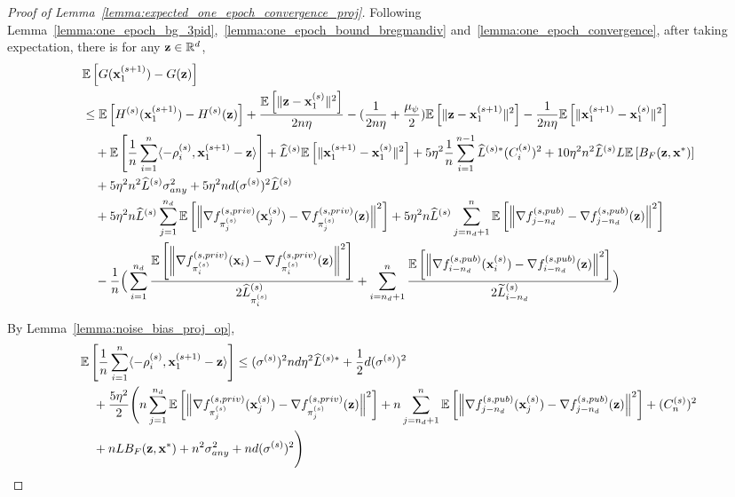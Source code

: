 \begin{proof}[Proof of Lemma~\ref{lemma:expected_one_epoch_convergence_proj}]
Following Lemma~\ref{lemma:one_epoch_bg_3pid},~\ref{lemma:one_epoch_bound_bregmandiv} and~\ref{lemma:one_epoch_convergence}, after taking expectation, there is for any ${\mathbf{z}}\in \mathbb{R}^{d}$,
\begin{align}
\label{eq:proj_interm}
    &\mathbb{E}\left[G({\mathbf{x}}_1^{(s+1)}) - G({\mathbf{z}})\right]\\
    \nonumber
    &\leq \mathbb{E}\left[ H^{(s)}({\mathbf{x}}_1^{(s+1)}) - H^{(s)}({\mathbf{z}})\right]
        + \frac{\mathbb{E}\left[\|{\mathbf{z}} - {\mathbf{x}}_1^{(s)}\|^2 \right]}{2n \eta}
    - (\frac{1}{2n \eta} + \frac{\mu_\psi}{2}) \mathbb{E}\left[\|{\mathbf{z}} - {\mathbf{x}}_1^{(s+1)}\|^2\right]
        - \frac{1}{2n \eta}\mathbb{E}\left[\|{\mathbf{x}}_1^{(s+1)} - {\mathbf{x}}_1^{(s)}\|^2 \right]\\
    \nonumber
    &\quad + \mathbb{E}\left[\frac{1}{n}\sum_{i=1}^{n}\langle -\rho_i^{(s)}, {\mathbf{x}}_1^{(s+1)} - {\mathbf{z}}\rangle\right]
    + \widehat{L}^{(s)}\mathbb{E}\left[\| {\mathbf{x}}_1^{(s+1)} - {\mathbf{x}}_1^{(s)}\|^2\right]
    + 5\eta^2 \frac{1}{n}\sum_{i=1}^{n-1} \widehat{L}^{(s)*} (C_i^{(s)})^2
    + 10 \eta^2 n^2 \widehat{L}^{(s)} L \mathbb{E}\left[B_F({\mathbf{z}}, {\mathbf{x}}^*)\right]\\
    \nonumber
    &\quad + 5\eta^2 n^2 \widehat{L}^{(s)} \sigma_{any}^2 + 5\eta^2 nd (\sigma^{(s)})^2 \widehat{L}^{(s)}\\
    \nonumber
    &\quad + 5\eta^2 n \widehat{L}^{(s)} \sum_{j=1}^{n_d} \mathbb{E}\left[\Big\| \nabla f_{\pi_j^{(s)}}^{(s, priv)}({\mathbf{x}}_{j}^{(s)}) - \nabla f_{\pi_j^{(s)}}^{(s, priv)}({\mathbf{z}})\Big\|^2\right]
        + 5\eta^2 n \widehat{L}^{(s)} \sum_{j=n_d+1}^{n} \mathbb{E}\left[\Big\| \nabla f_{j-n_d}^{(s, pub)} - \nabla f_{j-n_d}^{(s,pub)}({\mathbf{z}})\Big\|^2\right]\\
    \nonumber
        &\quad - \frac{1}{n} \Big( 
        \sum_{i=1}^{n_d} \frac{ \mathbb{E}\left[\left\|\nabla f_{\pi_i^{(s)}}^{(s, priv)}({\mathbf{x}}_i) - \nabla f_{\pi_i^{(s)}}^{(s, priv)}({\mathbf{z}}) \right\|^2 \right] }{2 \widehat{L}_{\pi_i^{(s)}}^{(s)}}
        + \sum_{i=n_d+1}^{n} \frac{ \mathbb{E}\left[ \left\| \nabla f_{i-n_d}^{(s, pub)}({\mathbf{x}}_i^{(s)}) - \nabla f_{i-n_d}^{(s, pub)}({\mathbf{z}}) \right\|^2\right] }{2\widetilde{L}_{i-n_d}^{(s)}}
        \Big) 
\end{align}


By Lemma~\ref{lemma:noise_bias_proj_op},
\begin{align}
\label{eq:noise_bias_proj_op}
    &\mathbb{E}\left[\frac{1}{n}\sum_{i=1}^{n} \langle -\rho_i^{(s)}, {\mathbf{x}}_1^{(s+1)} - {\mathbf{z}} \rangle \right] 
    \leq (\sigma^{(s)})^2 nd \eta^2 \widehat{L}^{(s)*}
    + \frac{1}{2}d (\sigma^{(s)})^2\\
    \nonumber
    &\quad + \frac{5\eta^2}{2} \Bigg(
        n\sum_{j=1}^{n_d} \mathbb{E}\left[\Big\| \nabla f_{\pi_j^{(s)}}^{(s,priv)}({\mathbf{x}}_j^{(s)}) - \nabla f_{\pi_j^{(s)}}^{(s,priv)}({\mathbf{z}})\Big\|^2\right]
        + n \sum_{j=n_d+1}^{n} \mathbb{E}\left[\Big\| \nabla f_{j-n_d}^{(s,pub)}({\mathbf{x}}_j^{(s)})
        - \nabla f_{j-n_d}^{(s,pub)}({\mathbf{z}})
        \Big\|^2 \right]
        + (C_n^{(s)})^2\\
    \nonumber
    &\quad + n L B_F({\mathbf{z}}, {\mathbf{x}}^*) + n^2 \sigma_{any}^2 + n d (\sigma^{(s)})^2
    \Bigg)
\end{align}


\end{proof}
